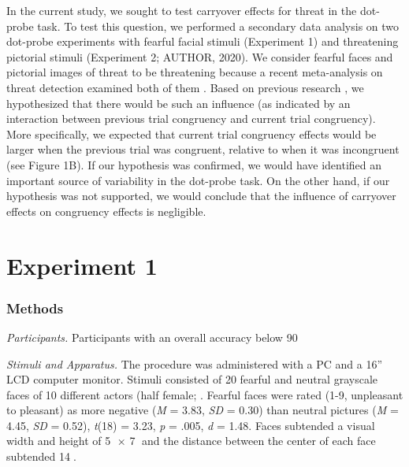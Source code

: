 \documentclass{article}
\begin{document}
	In the current study, we sought to test carryover effects for threat in the dot-probe task. To test this question, we performed a secondary data analysis on two dot-probe experiments with fearful facial stimuli (Experiment 1) and threatening pictorial stimuli (Experiment 2; AUTHOR, 2020). We consider fearful faces and pictorial images of threat to be threatening because a recent meta-analysis on threat detection examined both of them \parencite{Hedger2016}. Based on previous research \parencite{Gladwin2019b, Gladwin2020a}, we hypothesized that there would be such an influence (as indicated by an interaction between previous trial congruency and current trial congruency). More specifically, we expected that current trial congruency effects would be larger when the previous trial was congruent, relative to when it was incongruent (see Figure 1B). If our hypothesis was confirmed, we would have identified an important source of variability in the dot-probe task. On the other hand, if our hypothesis was not supported, we would conclude that the influence of carryover effects on congruency effects is negligible.



	\section{Experiment 1}



	\subsubsection{Methods}



	\emph{Participants. }Participants with an overall accuracy below 90%



	\emph{Stimuli and Apparatus. }The procedure was administered with a PC and a 16” LCD computer monitor. Stimuli consisted of 20 fearful and neutral grayscale faces of 10 different actors (half female; \parencite{Gur2002, Lundqvist1998}. Fearful faces were rated (1-9, unpleasant to pleasant) as more negative (\emph{M} = 3.83, \emph{SD} = 0.30) than neutral pictures (\emph{M} = 4.45, \emph{SD} = 0.52), \emph{t}(18) = 3.23, \emph{p} = .005, \emph{d} = 1.48. Faces subtended a visual width and height of 5 × 7 and the distance between the center of each face subtended 14.
\end{document}

